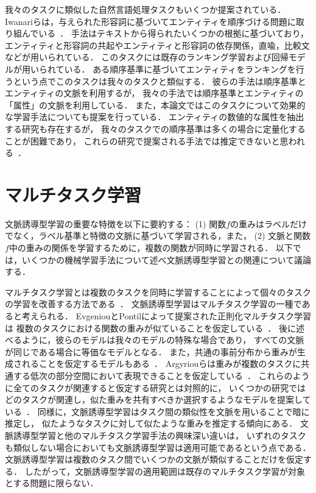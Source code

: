 我々のタスクに類似した自然言語処理タスクもいくつか提案されている．
Iwanariらは，与えられた形容詞に基づいてエンティティを順序づける問題に取り組んでいる~\cite{iwanari2016ordering}．
手法はテキストから得られたいくつかの根拠に基づいており，
エンティティと形容詞の共起やエンティティと形容詞の依存関係，直喩，比較文などが用いられている．
このタスクには既存のランキング学習および回帰モデルが用いられている．
ある順序基準に基づいてエンティティをランキングを行うという点でこのタスクは我々のタスクと類似する．
彼らの手法は順序基準とエンティティの文脈を利用するが，
我々の手法では順序基準とエンティティの「属性」の文脈を利用している．
また，本論文ではこのタスクについて効果的な学習手法についても提案を行っている．
エンティティの数値的な属性を抽出する研究も存在するが，
我々のタスクでの順序基準は多くの場合に定量化することが困難であり，
これらの研究で提案される手法では推定できないと思われる~\cite{takamura2015estimating,davidov2010extraction,madaan2016numerical}．

\section{マルチタスク学習}

文脈誘導型学習の重要な特徴を以下に要約する：
(1) 関数$f$の重みはラベルだけでなく，ラベル基準と特徴の文脈に基づいて学習される，また，
(2) 文脈と関数$f$中の重みの関係を学習するために，複数の関数が同時に学習される．
以下では，いくつかの機械学習手法について述べ文脈誘導型学習との関連について議論する．

マルチタスク学習とは複数のタスクを同時に学習することによって個々のタスクの学習を改善する方法である~\cite{caruana1997multitask}．
文脈誘導型学習はマルチタスク学習の一種であると考えられる．
EvgeniouとPontilによって提案された正則化マルチタスク学習は
複数のタスクにおける関数の重みが似ていることを仮定している~\cite{evgeniou2004regularized}．
後に述べるように，彼らのモデルは我々のモデルの特殊な場合であり，
すべての文脈が同じである場合に等価なモデルとなる．
また，共通の事前分布から重みが生成されることを仮定するモデルもある~\cite{yu2005learning,lee2007learning,daume2009bayesian}．
Argyriouらは重みが複数のタスクに共通する低次の部分空間において表現できることを仮定している~\cite{argyriou2008convex}．
これらのように全てのタスクが関連すると仮定する研究とは対照的に，
いくつかの研究ではどのタスクが関連し，似た重みを共有すべきか選択するようなモデルを提案している~\cite{jacob2009clustered,kumar2012learning}．
同様に，文脈誘導型学習はタスク間の類似性を文脈を用いることで暗に推定し，
似たようなタスクに対して似たような重みを推定する傾向にある．
文脈誘導型学習と他のマルチタスク学習手法の興味深い違いは，
いずれのタスクも類似しない場合においても文脈誘導型学習は適用可能であるという点である．
文脈誘導型学習は複数のタスク間でいくつかの文脈が類似することだけを仮定する．
したがって，文脈誘導型学習の適用範囲は既存のマルチタスク学習が対象とする問題に限らない．


